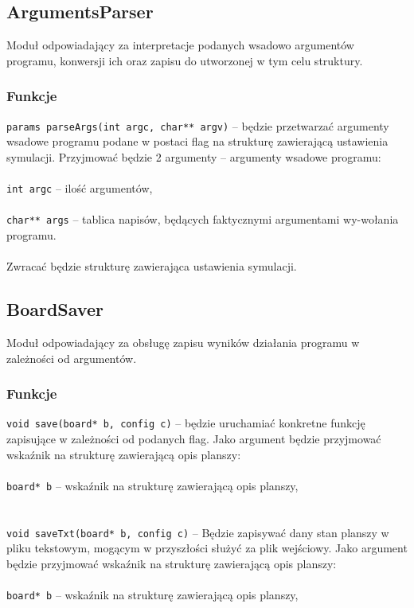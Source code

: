 \documentclass{article}
\begin{document}
\subsection{ArgumentsParser}
Moduł odpowiadający za interpretacje podanych wsadowo argumentów programu, konwersji ich oraz zapisu do utworzonej w tym celu struktury.

\subsubsection{Funkcje}
\texttt{params parseArgs(int argc, char** argv)} -- będzie przetwarzać argumenty wsadowe programu podane w postaci flag na strukturę zawierającą ustawienia symulacji. Przyjmować będzie 2 argumenty -- argumenty wsadowe programu:\\\\
	 \hspace*{10mm}\texttt{int argc} -- ilość argumentów,\\\\
	 \hspace*{10mm}\texttt{char** args} -- tablica napisów, będących faktycznymi argumentami wy-\hspace*{10mm}wołania programu.\\
\\
Zwracać będzie strukturę zawierająca ustawienia symulacji.

\subsection{BoardSaver}
Moduł odpowiadający za obsługę zapisu wyników działania programu w zależności od argumentów.

\subsubsection{Funkcje}
\texttt{void save(board* b, config c)} -- będzie uruchamiać konkretne funkcję zapisujące w zależności od podanych flag. Jako argument będzie przyjmować wskaźnik na strukturę zawierającą opis planszy:\\\\
	 \hspace*{10mm}\texttt{board* b} -- wskaźnik na strukturę zawierającą opis planszy,\\\\
\\
\texttt{void saveTxt(board* b, config c)} -- Będzie zapisywać dany stan planszy w pliku tekstowym, mogącym w przyszłości służyć za plik wejściowy. Jako argument będzie przyjmować wskaźnik na strukturę zawierającą opis planszy:\\\\
	 \hspace*{10mm}\texttt{board* b} -- wskaźnik na strukturę zawierającą opis planszy,\\\\
\\
\end{document}
